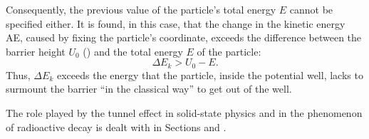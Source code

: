 Consequently, the previous value of the particle's total energy $E$ cannot be specified either. It is found, in this case, that the change in the kinetic energy AE, caused by fixing the particle's coordinate, exceeds the difference between the barrier height $U_{0}$ () and the total energy $E$ of the particle:
\begin{equation*}%
\Delta E_{k} > U_{0} - E.
\end{equation*}
Thus, $\Delta E_{k}$ exceeds the energy that the particle, inside the potential well, lacks to surmount the barrier ``in the classical way'' to get out of the well.

The role played by the tunnel effect in solid-state physics and
in the phenomenon of radioactive decay is dealt with in Sections  and .

